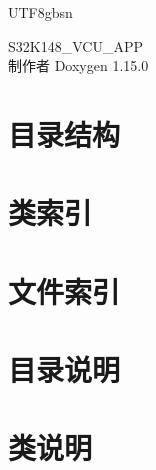 \documentclass[twoside]{book}
\newcommand{\+}{\discretionary{\mbox{\scriptsize$\hookleftarrow$}}{}{}}
\newcommand{\clearemptydoublepage}{%
    \newpage{\pagestyle{empty}\cleardoublepage}%
  }
\begin{document}
  \raggedbottom
  \begin{CJK}{UTF8}{gbsn}
    \hypersetup{pageanchor=false,
                bookmarksnumbered=true,
                pdfencoding=unicode
               }
  \begin{titlepage}
  \vspace*{7cm}
  \begin{center}%
  {\Large S32\+K148\+\_\+\+VCU\+\_\+\+APP}\\
  \vspace*{1cm}
  {\large 制作者 Doxygen 1.15.0}\\
  \end{center}
  \end{titlepage}
  \clearemptydoublepage
  \tableofcontents
  \clearemptydoublepage
  \hypersetup{pageanchor=true}
\chapter{目录结构}

\chapter{类索引}

\chapter{文件索引}

\chapter{目录说明}










\chapter{类说明}






















\end{CJK}
\end{document}

